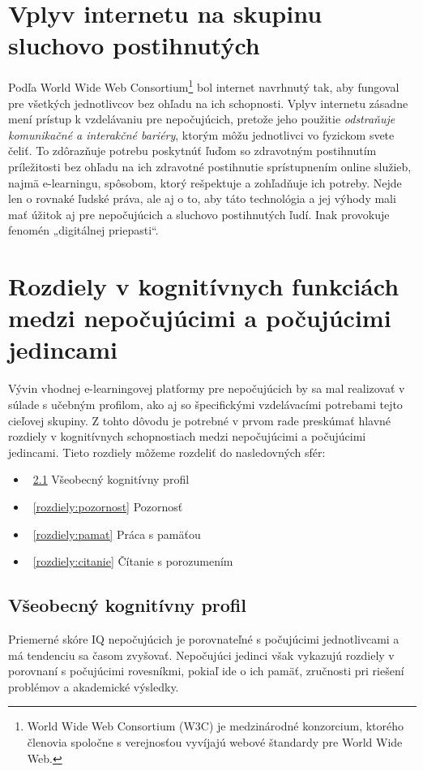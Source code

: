 \documentclass[10pt,oneside,slovak,a4paper]{article}
\begin{document}
\section{Vplyv internetu na skupinu sluchovo postihnutých} \label{vplyv}

Podľa World Wide Web Consortium\footnote{World Wide Web Consortium (W3C) je medzinárodné konzorcium, ktorého členovia spoločne s verejnosťou vyvíjajú webové štandardy pre World Wide Web\cite{WWWC}.} bol internet navrhnutý tak, aby fungoval pre všetkých jednotlivcov bez ohľadu na ich schopnosti. Vplyv internetu zásadne mení prístup k vzdelávaniu pre nepočujúcich, pretože jeho použitie \emph{odstraňuje komunikačné a interakčné bariéry}, ktorým môžu jednotlivci vo fyzickom svete čeliť. To zdôrazňuje potrebu poskytnúť ľuďom so zdravotným postihnutím príležitosti bez ohľadu na ich zdravotné postihnutie sprístupnením online služieb, najmä e-learningu, spôsobom, ktorý rešpektuje a zohľadňuje ich potreby. Nejde len o rovnaké ľudské práva, ale aj o to, aby táto technológia a jej výhody mali mať úžitok aj pre nepočujúcich a sluchovo postihnutých ľudí. Inak provokuje fenomén „digitálnej priepasti“\cite{pappas2018learning}.


\section{Rozdiely v kognitívnych funkciách medzi nepočujúcimi a počujúcimi jedincami} \label{rozdiely}
Vývin vhodnej e-learningovej platformy pre nepočujúcich by sa mal realizovať v súlade s učebným profilom, ako aj so špecifickými vzdelávacími potrebami  tejto cieľovej skupiny. Z tohto dôvodu je potrebné v prvom rade preskúmať hlavné rozdiely v kognitívnych schopnostiach medzi nepočujúcimi a počujúcimi jedincami.\linebreak
Tieto rozdiely môžeme rozdeliť do nasledovných sfér:
\begin{itemize}
\item ~\ref{rozdiely:vseob} Všeobecný kognitívny profil
\item ~\ref{rozdiely:pozornost} Pozornosť
\item ~\ref{rozdiely:pamat} Práca s pamäťou
\item ~\ref{rozdiely:citanie} Čítanie s porozumením
\end{itemize}



\subsection{Všeobecný kognitívny profil} \label{rozdiely:vseob}
Priemerné skóre IQ nepočujúcich je porovnateľné s počujúcimi jednotlivcami a má tendenciu sa časom zvyšovať. Nepočujúci jedinci však vykazujú rozdiely v porovnaní s počujúcimi rovesníkmi, pokiaľ ide o ich pamäť, zručnosti pri riešení problémov a akademické výsledky.
\end{document}
